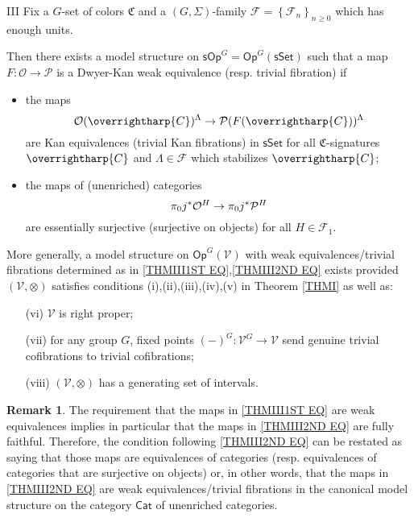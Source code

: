 \documentclass[a4paper,10pt
,draft
]{article}%
\numberwithin{equation}{section}
\numberwithin{figure}{section}
\theoremstyle{definition} %
\newtheorem{remark}[equation]{Remark}%
\newcommand{\set}[1]{\left\{#1\right\}}%
\newcommand{\vect}[1]{\text{\overrightharp{\ensuremath{#1}}}}
\newcommand{\Op}{\mathsf{Op}}%
\newcommand{\F}{\ensuremath{\mathcal F}}
\newcommand{\V}{\ensuremath{\mathcal V}}
\renewcommand{\O}{\ensuremath{\mathcal O}}
\newcommand{\1}{\ensuremath{\mathbbm 1}}%
\begin{document}
\begin{customthm}{III}
      \label{THMIII}
Fix a $G$-set of colors $\mathfrak{C}$
and a $(G,\Sigma)$-family $\F = \set{\F_n}_{n \geq 0}$
which has enough units.

Then there exists a model structure on
$\mathsf{sOp}^G = 
\mathsf{Op}^G(\mathsf{sSet})$
such that a map
$F\colon \mathcal{O} \to \mathcal{P}$
is a Dwyer-Kan weak equivalence (resp. trivial fibration) if
\begin{itemize}
\item the maps
\begin{equation}\label{THMIII1ST EQ}
	\O(\vect{C})^{\Lambda} \to \mathcal{P}(F(\vect{C}))^{\Lambda}
\end{equation}
are Kan equivalences (trivial Kan fibrations)
in $\mathsf{sSet}$
for all $\mathfrak{C}$-signatures $\vect{C}$
and $\Lambda \in \F$ which stabilizes $\vect{C}$;
\item 
the maps of (unenriched) categories
\begin{equation}\label{THMIII2ND EQ}
\pi_0 j^{\**} \O^H 
\to 
\pi_0 j^{\**} \mathcal{P}^H 
\end{equation}
are essentially surjective (surjective on objects)
for all $H \in \F_1$.
\end{itemize}
More generally, a model structure on 
$\Op^G(\V)$
with weak equivalences/trivial fibrations determined as in 
\eqref{THMIII1ST EQ},\eqref{THMIII2ND EQ}
exists provided $(\V,\otimes)$ satisfies conditions
(i),(ii),(iii),(iv),(v) in Theorem \ref{THMI}
as well as:
\begin{enumerate}
	\item[(vi)] $\V$ is right proper;
	\item[(vii)]
	for any group $G$, fixed points
	$(-)^{G} \colon \V^G \to \V$
	send genuine trivial cofibrations to trivial cofibrations;
	\item[(viii)] $(\V, \otimes)$ has a generating set of intervals.
\end{enumerate}
\end{customthm}





\begin{remark}\label{WETRFCAN REM}
The requirement that the maps in 
\eqref{THMIII1ST EQ}
are weak equivalences implies in particular that the maps in
\eqref{THMIII2ND EQ}
are fully faithful.
Therefore, the condition following \eqref{THMIII2ND EQ}
can be restated as saying that those maps are
equivalences of categories (resp. equivalences of categories that are surjective on objects) or, in other words,
that the maps in \eqref{THMIII2ND EQ}
are weak equivalences/trivial fibrations in the canonical model structure on the category $\mathsf{Cat}$ of unenriched categories.
\end{remark}
\end{document}
